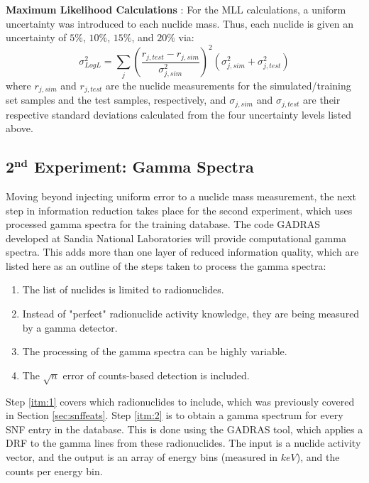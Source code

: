 \noindent \textbf{Maximum Likelihood Calculations} : For the \gls{MLL}
calculations, a uniform uncertainty was introduced to each nuclide mass.  Thus,
each nuclide is given an uncertainty of $5\%$, $10\%$, $15\%$, and $20\%$
via:
\begin{equation}
  \label{eq:mllunc}
  \sigma_{Log L}^2 = \sum_j \left( 
                            \frac{r_{j,test} - r_{j,sim}}{\sigma_{j,sim}^2}
                            \right)^2 
                            (\sigma_{j,sim}^2 + \sigma_{j,test}^2)
\end{equation}
where $r_{j,sim}$ and $r_{j,test}$ are the nuclide measurements for the
simulated/training set samples and the test samples, respectively, and
$\sigma_{j,sim}$ and $\sigma_{j,test}$ are their respective standard
deviations calculated from the four uncertainty levels listed above.

\subsection{2$^{\mathbf{nd}}$ Experiment: Gamma Spectra}
\label{sec:gamerr}

Moving beyond injecting uniform error to a nuclide mass measurement, the next
step in information reduction takes place for the second experiment, which uses
processed gamma spectra for the training database.  The code \gls{GADRAS}
\cite{gadras} developed at Sandia National Laboratories will provide
computational gamma spectra.  This adds more than one layer of reduced
information quality, which are listed here as an outline of the steps taken to
process the gamma spectra:

\begin{enumerate}
  \item \label{itm:1} The list of nuclides is limited to radionuclides.
  \item \label{itm:2} Instead of "perfect" radionuclide activity knowledge, 
        they are being measured by a gamma detector.
  \item \label{itm:3} The processing of the gamma spectra can be highly variable.
  \item \label{itm:4} The $\sqrt{n}$ error of counts-based detection is included. 
\end{enumerate}

Step \ref{itm:1} covers which radionuclides to include, which was previously
covered in Section \ref{sec:snffeats}. Step \ref{itm:2} is to obtain a gamma
spectrum for every \gls{SNF} entry in the database. This is done using the
\gls{GADRAS} tool, which applies a \gls{DRF} to the gamma lines from these
radionuclides. The input is a nuclide activity vector, and the output is an
array of energy bins (measured in $keV$), and the counts per energy bin.

